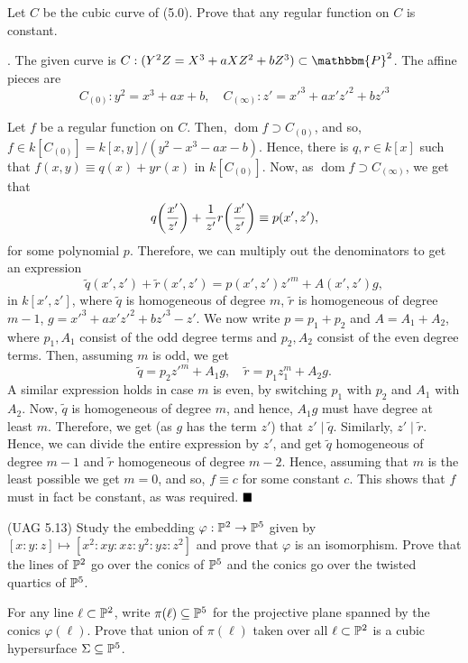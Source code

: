 \documentclass[12pt]{article}
\begin{document}
\begin{prob}
    Let \( C \) be the cubic curve of (5.0). Prove that any regular function on \( C \) is constant.
\end{prob}

\sol. The given curve is \( C: (Y^2Z = X^3 + aXZ^2 + bZ^3) \subset \mathbbm{P}^2 \). The affine pieces are
\[
    C_{(0)}: y^2 = x^3+ax+b, \quad C_{(\infty)}: z' = x'^3+ax'z'^2+bz'^3
\]

Let \( f \) be a regular function on \( C \). Then, \( \operatorname{dom} f \supset C_{(0)} \), and so, \( f \in k[C_{(0)}] = k[x,y]/(y^2-x^3-ax-b) \). Hence, there is \( q,r \in k[x] \) such that \( f(x,y) \equiv q(x) + y r(x) \) in \( k[C_{(0)}] \). Now, as \( \operatorname{dom} f \supset C_{(\infty)} \), we get that
\[
    q \qty(\frac{x'}{z'}) + \frac{1}{z'}r\qty(\frac{x'}{z'}) \equiv p(x',z'),
\]
for some polynomial \( p \). Therefore, we can multiply out the denominators to get an expression
\[
    \widetilde{q}(x',z') + \widetilde{r}(x',z') = p(x',z')z'^m + A(x',z')g,
\]
in \( k[x',z'] \), where \( \widetilde{q} \) is homogeneous of degree \( m \), \( \widetilde{r} \) is homogeneous of degree \( m-1 \), \( g = x'^3+ax'z'^2+bz'^3-z' \). We now write \( p = p_1+p_2 \) and \( A = A_1+A_2 \), where \( p_1,A_1 \) consist of the odd degree terms and \( p_2,A_2 \) consist of the even degree terms. Then, assuming \( m \) is odd, we get
\[
    \widetilde{q} = p_2z'^m + A_1g, \quad \widetilde{r} = p_1z_1^m + A_2g.
\]
A similar expression holds in case \( m \) is even, by switching \( p_1 \) with \( p_2 \) and \( A_1 \) with \( A_2 \). Now, \( \widetilde{q} \) is homogeneous of degree \( m \), and hence, \( A_1g \) must have degree at least \( m \). Therefore, we get (as \( g \) has the term \( z' \)) that \( z' \mid \widetilde{q}\). Similarly, \( z' \mid \widetilde{r} \). Hence, we can divide the entire expression by \( z' \), and get \( \widetilde{q} \) homogeneous of degree \( m-1 \) and \( \widetilde{r} \) homogeneous of degree \( m-2 \). Hence, assuming that \( m \) is the least possible we get \( m=0 \), and so, \( f \equiv c \) for some constant \( c \). This shows that \( f \) must in fact be constant, as was required. \(\hfill \blacksquare\)

\begin{prob} %
    (UAG 5.13) Study the embedding $\varphi : \mathbb{P}^2 \to \mathbb{P}^5$ given by $[x:y:z] \mapsto [x^2:xy:xz:y^2:yz:z^2]$ and prove that $\varphi$ is an isomorphism. Prove that the lines of $\mathbb{P}^2$ go over the conics of $\mathbb{P}^5$ and the conics go over the twisted quartics of $\mathbb{P}^5$.

    \vspace*{0.2cm}

    \noindent For any line $\ell \subset \mathbb{P}^2$, write $\pi(\ell) \subseteq \mathbb{P}^5$ for the projective plane spanned by the conics $\varphi(\ell)$. Prove that union of $\pi(\ell)$ taken over all $\ell \subset \mathbb{P}^2$ is a cubic hypersurface $\Sigma \subseteq \mathbb{P}^5$.
\end{prob}
\end{document}
